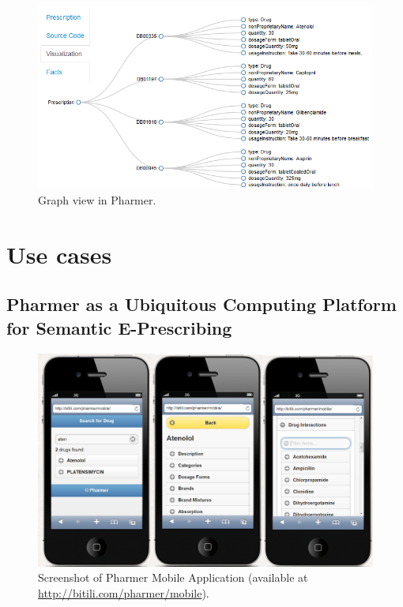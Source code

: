 \documentclass[journal]{IEEEtran}
\begin{document}
\begin{figure}[tb]
	\centering
		\includegraphics[width=1\columnwidth]{images/sc2.png}
	\caption{Graph view in Pharmer.}
	\label{fig:graphview}
\end{figure}

\section{Use cases}
\label{sec:usecases}

\subsection{Pharmer as a Ubiquitous Computing Platform for Semantic E-Prescribing}
\label{sec:mobile}

\begin{figure}[tb]
 \centering
 \includegraphics[width=1.5\columnwidth]{images/sc_pharmer.png}
	\caption{Screenshot of Pharmer Mobile Application (available at \url{http://bitili.com/pharmer/mobile}).}
 \label{fig:mobile}
\end{figure}
\end{document}
